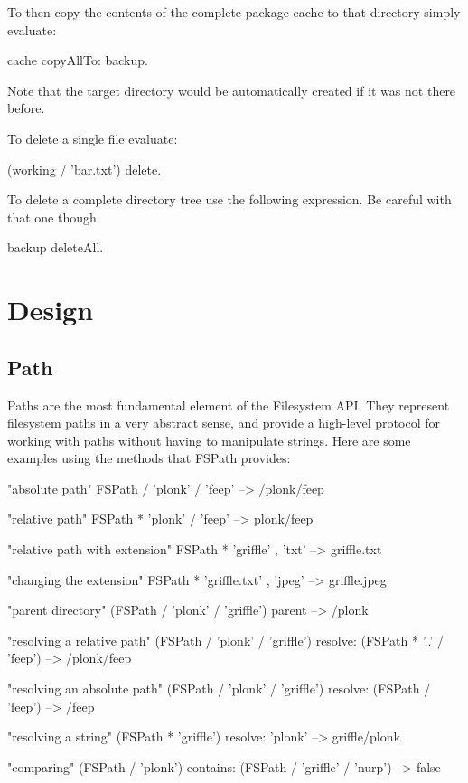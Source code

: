 \documentclass[a4paper,10pt,twoside]{book}
\begin{document}
To then copy the contents of the complete package-cache to that directory simply evaluate:

\begin{code}{}
 cache copyAllTo: backup.
\end{code}

Note that the target directory would be automatically created if it was not there before.

To delete a single file evaluate:

\begin{code}{}
 (working / 'bar.txt') delete.
\end{code}

To delete a complete directory tree use the following expression. Be careful with that one though.

\begin{code}
 backup deleteAll.
\end{code}


\section{Design }

\subsection{Path}

Paths are the most fundamental element of the Filesystem API. They represent filesystem paths in a very abstract sense, and provide a high-level protocol for working with paths without having to manipulate strings. Here are some examples using the methods that FSPath provides:

\begin{code}{}
    "absolute path"
    FSPath / 'plonk' / 'feep'       --> /plonk/feep
    
    "relative path"
    FSPath * 'plonk' / 'feep'       --> plonk/feep

    "relative path with extension"
    FSPath * 'griffle' , 'txt'      --> griffle.txt
    
    "changing the extension"
    FSPath * 'griffle.txt' , 'jpeg'     --> griffle.jpeg
    
    "parent directory"
    (FSPath / 'plonk' / 'griffle') parent   --> /plonk
    
    "resolving a relative path"
    (FSPath / 'plonk' / 'griffle') resolve: (FSPath * '..' / 'feep')
                        --> /plonk/feep
    
    "resolving an absolute path"
    (FSPath / 'plonk' / 'griffle') resolve: (FSPath / 'feep')
                        --> /feep
                        
    "resolving a string"
    (FSPath * 'griffle') resolve: 'plonk'   --> griffle/plonk
                        
    "comparing"
    (FSPath / 'plonk') contains: (FSPath / 'griffle' / 'nurp')
                        --> false
\end{code}
\end{document}

